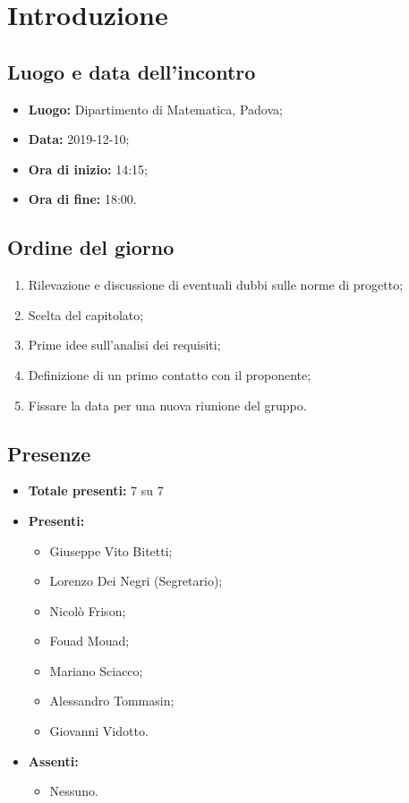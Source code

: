 \section*{Introduzione}

\subsection*{Luogo e data dell'incontro}
	\begin{itemize}
		\item \textbf{Luogo:} Dipartimento di Matematica, Padova;
		\item \textbf{Data:} 2019-12-10;
		\item \textbf{Ora di inizio:} 14:15;
		\item \textbf{Ora di fine:} 18:00.
	\end{itemize}

\subsection*{Ordine del giorno}
	\begin{enumerate}
		\item Rilevazione e discussione di eventuali dubbi sulle norme di progetto;
		\item Scelta del capitolato;
		\item Prime idee sull'analisi dei requisiti;
		\item Definizione di un primo contatto con il proponente;
		\item Fissare la data per una nuova riunione del gruppo.
	\end{enumerate}

\subsection*{Presenze}
	\begin{itemize}
		\item \textbf{Totale presenti:} 7 su 7
		\item \textbf{Presenti: }
			\begin{itemize}			
				\item Giuseppe Vito Bitetti;
				\item Lorenzo Dei Negri (Segretario);
				\item Nicolò Frison;
				\item Fouad Mouad;
				\item Mariano Sciacco;
				\item Alessandro Tommasin;
				\item Giovanni Vidotto.
			\end{itemize}
		\item \textbf{Assenti: } 
			\begin{itemize}	
				\item Nessuno.
			\end{itemize}
	\end{itemize}


